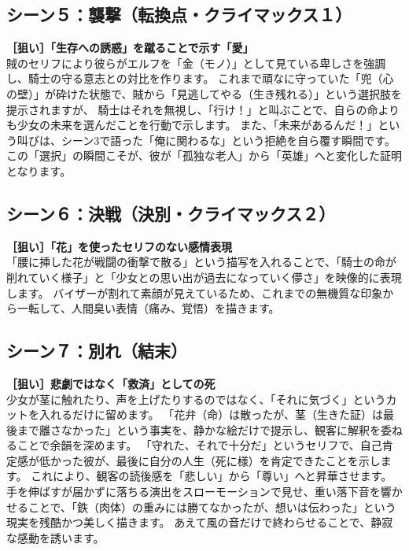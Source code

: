 \subsection{シーン５：襲撃（転換点・クライマックス１）}

\textbf{［狙い］「生存への誘惑」を蹴ることで示す「愛」} \\
賊のセリフにより彼らがエルフを「金（モノ）」として見ている卑しさを強調し、騎士の守る意志との対比を作ります。
これまで頑なに守っていた「兜（心の壁）」が砕けた状態で、賊から「見逃してやる（生き残れる）」という選択肢を提示されますが、
騎士はそれを無視し、「行け！」と叫ぶことで、自らの命よりも少女の未来を選んだことを行動で示します。
また、「未来があるんだ！」という叫びは、シーン3で語った「俺に関わるな」という拒絶を自ら覆す瞬間です。
この「選択」の瞬間こそが、彼が「孤独な老人」から「英雄」へと変化した証明となります。

\subsection{シーン６：決戦（決別・クライマックス２）}
\textbf{［狙い］「花」を使ったセリフのない感情表現} \\
「腰に挿した花が戦闘の衝撃で散る」という描写を入れることで、「騎士の命が削れていく様子」と「少女との思い出が過去になっていく儚さ」を映像的に表現します。
バイザーが割れて素顔が見えているため、これまでの無機質な印象から一転して、人間臭い表情（痛み、覚悟）を描きます。

\subsection{シーン７：別れ（結末）}
\textbf{［狙い］悲劇ではなく「救済」としての死} \\
少女が茎に触れたり、声を上げたりするのではなく、「それに気づく」というカットを入れるだけに留めます。
「花弁（命）は散ったが、茎（生きた証）は最後まで離さなかった」という事実を、静かな絵だけで提示し、観客に解釈を委ねることで余韻を深めます。
「守れた、それで十分だ」というセリフで、自己肯定感が低かった彼が、最後に自分の人生（死に様）を肯定できたことを示します。
これにより、観客の読後感を「悲しい」から「尊い」へと昇華させます。
手を伸ばすが届かずに落ちる演出をスローモーションで見せ、重い落下音を響かせることで、「鉄（肉体）の重みには勝てなかったが、想いは伝わった」という現実を残酷かつ美しく描きます。
あえて風の音だけで終わらせることで、静寂な感動を誘います。

